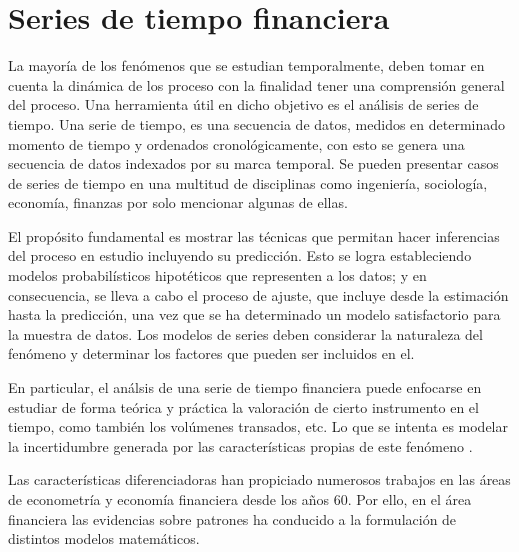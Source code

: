 \section{Series de tiempo financiera}

La mayoría de los fenómenos que se estudian temporalmente, deben tomar en cuenta la dinámica de los proceso con la finalidad tener una 
comprensión general del proceso. Una herramienta útil en dicho objetivo es el análisis de series de tiempo. Una serie de tiempo, es una secuencia de datos, 
medidos en determinado momento de tiempo y ordenados cronológicamente, con esto se genera una secuencia de datos indexados por su marca temporal. Se pueden presentar 
casos de series de tiempo en una multitud de disciplinas como ingeniería, sociología, economía, finanzas por solo mencionar algunas de ellas.

El propósito fundamental es mostrar las técnicas que permitan hacer inferencias del proceso en estudio incluyendo su predicción. Esto se logra estableciendo modelos
probabilísticos hipotéticos que representen a los datos; y en consecuencia, se lleva a cabo el proceso de ajuste, que incluye desde la estimación hasta la 
predicción, una vez que se ha determinado un modelo satisfactorio para la muestra de datos. Los modelos de series deben considerar la naturaleza del fenómeno y 
determinar los factores que pueden ser incluidos en el.

En particular, el análsis de una serie de tiempo financiera puede enfocarse en estudiar de forma teórica y práctica la valoración de cierto instrumento en el tiempo,
como también los volúmenes transados, etc. Lo que se intenta es modelar la incertidumbre generada por las características propias de este fenómeno \cite{tsay2005analysis}. 


Las características diferenciadoras han propiciado numerosos trabajos en las áreas de econometría y economía financiera desde los años 60. Por ello, en el área 
financiera las evidencias sobre patrones ha conducido a la formulación de distintos modelos matemáticos.

